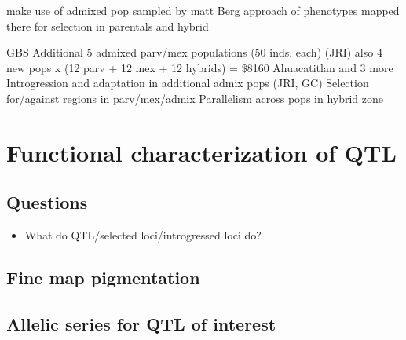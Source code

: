 make use of admixed pop sampled by matt
Berg approach of phenotypes mapped there for selection in parentals and hybrid

GBS Additional 5 admixed parv/mex populations (50 inds. each) (JRI)
also 4 new pops x (12 parv + 12 mex + 12 hybrids) = \$8160
Ahuacatitlan and 3 more
Introgression and adaptation in additional admix pops (JRI, GC)
Selection for/against regions in parv/mex/admix
Parallelism across pops in hybrid zone

\section{Functional characterization of QTL} \label{sec:funchar}

\subsection{Questions}
\begin{itemize}
\item What do QTL/selected loci/introgressed loci do?
\end{itemize}

\subsection{Fine map pigmentation} \label{subsec:pigment}

\subsection{Allelic series for QTL of interest} \label{subsec:series}

